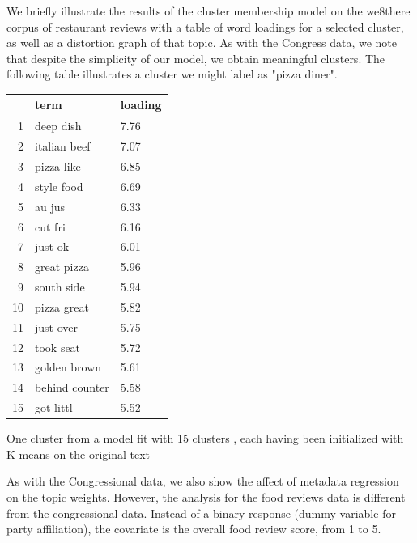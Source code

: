 \documentclass[12pt]{article}
\begin{document}
We briefly illustrate the results of the cluster membership model on the we8there corpus of restaurant reviews with a table of word loadings for a selected cluster, as well as a distortion graph of that topic. 
As with the Congress data, we note that despite the simplicity of our model, we obtain meaningful clusters. The following table illustrates a cluster we might label as "pizza diner". 


\begin{table}[ht]
\centering
\begin{threeparttable}
\begin{tabular}{rll}
  \hline
 & term & loading \\ 
  \hline
1 & deep dish & 7.76 \\ 
  2 & italian beef & 7.07 \\ 
  3 & pizza like & 6.85 \\ 
  4 & style food & 6.69 \\ 
  5 & au jus & 6.33 \\ 
  6 & cut fri & 6.16 \\ 
  7 & just ok & 6.01 \\ 
  8 & great pizza & 5.96 \\ 
  9 & south side & 5.94 \\ 
  10 & pizza great & 5.82 \\ 
  11 & just over & 5.75 \\ 
  12 & took seat & 5.72 \\ 
  13 & golden brown & 5.61 \\ 
  14 & behind counter & 5.58 \\ 
  15 & got littl & 5.52 \\ 
   \hline
\end{tabular}
\begin{tablenotes}
\small
\item One cluster from a model fit with 15 clusters , each having been initialized with K-means on the original text
\end{tablenotes}
\end{threeparttable}
\end{table}


As with the Congressional data, we also show the affect of metadata regression on the topic weights. However, the analysis for the food reviews data is different from the congressional data. Instead of a binary response (dummy variable for party affiliation), the covariate is the overall food review score, from 1 to 5.
\end{document}
